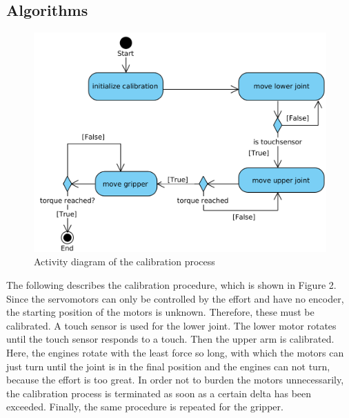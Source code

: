 \documentclass[conference]{IEEEtran}
\begin{document}
\subsection{Algorithms}\label{sec:algorithms}
\begin{figure}[bt] 
	\centering
	\includegraphics[width=\textwidth/2]{img/calibration.png}
	\caption[caption]{Activity diagram of the calibration process}
\label{fig:calibration}
\end{figure}
The following describes the calibration procedure, which is shown in Figure 2. Since the servomotors can only be controlled by the effort and have no encoder, the starting position of the motors is unknown. Therefore, these must be calibrated. A touch sensor is used for the lower joint. The lower motor rotates until the touch sensor responds to a touch. Then the upper arm is calibrated. Here, the engines rotate with the least force so long, with which the motors can just turn until the joint is in the final position and the engines can not turn, because the effort is too great. In order not to burden the motors unnecessarily, the calibration process is terminated as soon as a certain delta has been exceeded. Finally, the same procedure is repeated for the gripper.
\end{document}
